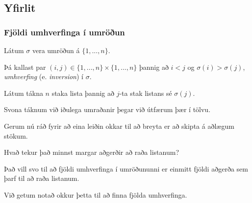 \subsection{Yfirlit}
{
    \frametitle{Fjöldi umhverfinga í umröðun}
    {
        \item<1-> Látum $\sigma$ vera umröðun á $\{1, ..., n\}$.
        \item<2-> Þá kallast par $(i, j) \in \{1, ..., n\} \times \{1, ..., n\}$ þannig að $i < j$ og $\sigma(i) > \sigma(j)$,
            \emph{umhverfing} (e. \emph{inversion}) í $\sigma$.
        \item<3-> Látum  tákna $n$ staka lista þannig að $j$-ta stak listans sé $\sigma(j)$.
        \item<4-> Svona táknum við iðulega umraðanir þegar við útfærum þær í tölvu.
        \item<5-> Gerum nú ráð fyrir að eina leiðin okkar til að breyta  er að skipta á aðlægum stökum.
        \item<6-> Hvað tekur það minnst margar aðgerðir að raða listanum?
        \item<7-> Það vill svo til að fjöldi umhverfinga í umröðununni er einmitt fjöldi aðgerða sem þarf til að raða listanum.
        \item<8-> Við getum notað okkur þetta til að finna fjölda umhverfinga.
    }
}

